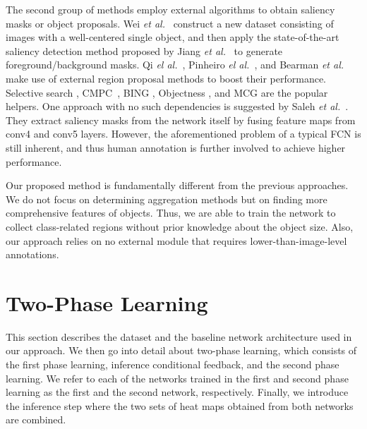 \documentclass[10pt,twocolumn,letterpaper]{article}
\begin{document}
The second group of methods employ external algorithms to obtain saliency masks or object proposals. Wei \textit{et al.}~\cite{Wei15stc} construct a new dataset consisting of images with a well-centered single object, and then apply the state-of-the-art saliency detection method proposed by Jiang \textit{et al.}~\cite{JiangWYWZL13drfi} to generate foreground/background masks. Qi \textit{el al.}~\cite{QiLSZJ16aug}, Pinheiro \textit{el al.}~\cite{Pinheiro2015CVPR}, and Bearman \textit{et al.}~\cite{BearmanRFL16wtp} make use of external region proposal methods to boost their performance. Selective search \cite{UijlingsSGS13ss}, CMPC~\cite{carreira2012pami}, BING \cite{ChengZLT14bing}, Objectness \cite{AlexeDF12obj}, and MCG \cite{ArbelaezPBMM14mcg} are the popular helpers. One approach with no such dependencies is suggested by  Saleh \textit{et al.}~\cite{SalehASPGA16builtin}. They extract saliency masks from the network itself by fusing feature maps from conv4 and conv5 layers. However, the aforementioned problem of a typical FCN is still inherent, and thus human annotation is further involved to achieve higher performance.

Our proposed method is fundamentally different from the previous approaches. We do not focus on determining aggregation methods but on finding more comprehensive features of objects. Thus, we are able to train the network to collect class-related regions without prior knowledge about the object size. Also, our approach relies on no external module that requires lower-than-image-level annotations.



\section{Two-Phase Learning}
\label{sec:two_phase_learning}
This section describes the dataset and the baseline network architecture used in our approach. We then go into detail about two-phase learning, which consists of the first phase learning, inference conditional feedback, and the second phase learning. %
We refer to each of the networks trained in the first and second phase learning as the first and the second network, respectively. Finally, we introduce the inference step where the two sets of heat maps obtained from both networks are combined.
\end{document}
